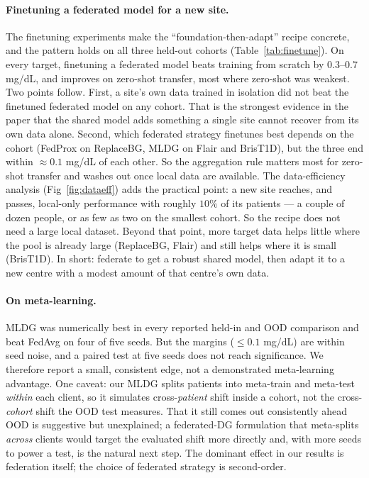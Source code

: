 \documentclass[10pt,letterpaper]{article}
\begin{document}
\paragraph{Finetuning a federated model for a new site.} The finetuning
experiments make the ``foundation-then-adapt'' recipe concrete, and the
pattern holds on all three held-out cohorts (Table~\ref{tab:finetune}). On
every target, finetuning a federated model beats training from scratch by
$0.3$--$0.7$ mg/dL, and improves on zero-shot transfer, most where zero-shot
was weakest. Two points follow. First, a site's own data trained in isolation
did not beat the finetuned federated model on any cohort. That is the
strongest evidence in the paper that the shared model adds something a single
site cannot recover from its own data alone. Second, which federated strategy
finetunes best depends on the cohort (FedProx on ReplaceBG, MLDG on Flair and
BrisT1D), but the three end within $\approx 0.1$ mg/dL of each other. So the
aggregation rule matters most for zero-shot transfer and washes out once
local data are available. The data-efficiency analysis
(Fig~\ref{fig:dataeff}) adds the practical point: a new site reaches, and
passes, local-only performance with roughly $10\%$ of its patients --- a
couple of dozen people, or as few as two on the smallest cohort. So the
recipe does not need a large local dataset. Beyond that point, more target
data helps little where the pool is already large (ReplaceBG, Flair) and
still helps where it is small (BrisT1D). In short: federate to get a robust
shared model, then adapt it to a new centre with a modest amount of that
centre's own data.

\paragraph{On meta-learning.} MLDG was numerically best in every reported
held-in and OOD comparison and beat FedAvg on four of five seeds. But the
margins ($\le 0.1$ mg/dL) are within seed noise, and a paired test at five
seeds does not reach significance. We therefore report a small, consistent
edge, not a demonstrated meta-learning advantage. One caveat: our MLDG splits
patients into meta-train and meta-test \emph{within} each client, so it
simulates cross-\emph{patient} shift inside a cohort, not the
cross-\emph{cohort} shift the OOD test measures. That it still comes out
consistently ahead OOD is suggestive but unexplained; a federated-DG
formulation that meta-splits \emph{across} clients would target the evaluated
shift more directly and, with more seeds to power a test, is the natural next
step. The dominant effect in our results is federation itself; the choice of
federated strategy is second-order.
\end{document}
